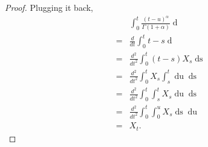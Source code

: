 \documentclass[a4paper, twoside, 11pt]{article}
\theoremstyle{definition}
\begin{document}
\begin{proof}
	Plugging it back,
	\begin{eqnarray*}
	  &&\int_0^t \frac{(t-u)^\alpha}{\Gamma(1+\alpha)}\mathop{dX^{(\alpha)}_u}\nonumber\\
	  &=& \frac{d}{dt}\int_0^t t-s \mathop{dX_s}\\
	  &=& \frac{d^2}{dt^2}\int_0^t (t-s) X_s \mathop{ds}\\
	  &=& \frac{d^2}{dt^2}\int_0^t X_s \int_s^t \mathop{du}  \mathop{ds}\\
	  &=& \frac{d^2}{dt^2} \int_0^t \int_s^t X_s \mathop{du}  \mathop{ds}\\
	  &=& \frac{d^2}{dt^2} \int_0^t \int_0^u X_s \mathop{ds}  \mathop{du}\\
	  &=& X_t.
	\end{eqnarray*}
  \end{proof}
\end{document}
